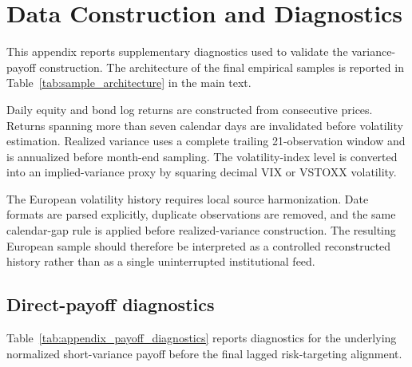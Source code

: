 \section{Data Construction and Diagnostics}
\label{app:data}

This appendix reports supplementary diagnostics used to validate the variance-payoff construction. The architecture of the final empirical samples is reported in Table~\ref{tab:sample_architecture} in the main text.



Daily equity and bond log returns are constructed from consecutive prices. Returns spanning more than seven calendar days are invalidated before volatility estimation. Realized variance uses a complete trailing 21-observation window and is annualized before month-end sampling. The volatility-index level is converted into an implied-variance proxy by squaring decimal VIX or VSTOXX volatility.

The European volatility history requires local source harmonization. Date formats are parsed explicitly, duplicate observations are removed, and the same calendar-gap rule is applied before realized-variance construction. The resulting European sample should therefore be interpreted as a controlled reconstructed history rather than as a single uninterrupted institutional feed.

\subsection{Direct-payoff diagnostics}

Table~\ref{tab:appendix_payoff_diagnostics} reports diagnostics for the underlying normalized short-variance payoff before the final lagged risk-targeting alignment.

\begin{table}[H]
\centering
\caption{Underlying normalized short-variance payoff diagnostics}
\label{tab:appendix_payoff_diagnostics}
\small
{}
\end{table}

